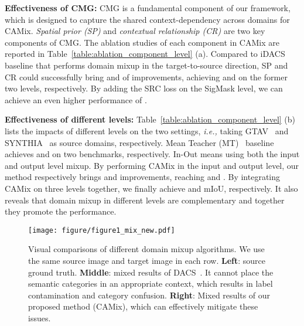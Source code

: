 \documentclass[journal]{IEEEtran}
\begin{document}
{\begin{minipage}{\textwidth}
\noindent \textbf{Effectiveness of CMG:} 
CMG is a  fundamental component of our framework, which is designed to capture the shared context-dependency across domains for CAMix. \textit{Spatial prior (SP)} and \textit{contextual relationship (CR)} are two key components of CMG. The ablation studies of each component in CAMix are reported in Table~\ref{table:ablation_component_level} (a).  Compared to iDACS~\cite{tranheden2020dacs} baseline that performs domain mixup in the target-to-source direction, SP and CR could successfully bring  and  of improvements, achieving  and  on the former two levels, respectively. By adding the SRC loss on the SigMask level, we can achieve an even higher performance of .



\noindent \textbf{Effectiveness of different levels:}
Table~\ref{table:ablation_component_level} (b) lists the impacts of different levels on the two settings, \emph{i.e.,} taking GTAV~\cite{stephan2016gtav} and SYNTHIA~\cite{ros2016synthia} as source domains, respectively. Mean Teacher (MT)~\cite{Mean_teacher} baseline achieves  and  on two benchmarks, respectively. In-Out means using both the input and output level mixup. By performing CAMix in the input and output level, our method respectively brings  and  improvements, reaching  and . 
By integrating CAMix on three levels together, we finally achieve  and  mIoU, respectively. It also reveals that domain mixup in different levels are complementary and together they promote the performance.

\begin{table}[t]
\caption{Ablation study of the SRC loss.}
\label{table:ablation_src}
\begin{center}
\end{center}
\end{table}

\begin{figure}[t]
\centering
\texttt{[image: figure/figure1\_mix\_new.pdf]}
\caption{
Visual comparisons of different domain mixup algorithms. We use the same source image and target image in each row. \textbf{Left}: source ground truth. \textbf{Middle}: mixed results of DACS~\cite{tranheden2020dacs}. It cannot place the semantic categories in an appropriate context, which results in label contamination and category confusion. \textbf{Right}: Mixed results of our proposed method (CAMix), which can effectively mitigate these issues. }
\label{fig:visulization_mixup}
\vspace{-5mm}
\end{figure}


\end{minipage}}
\end{document}
